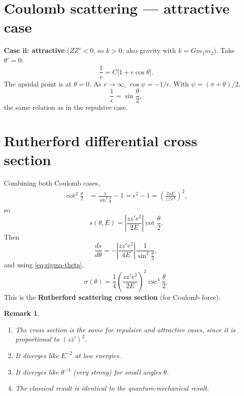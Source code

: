 \documentclass[11pt]{article}
\newtheorem{remark}{Remark}
\begin{document}
\section{Coulomb scattering --- attractive case}

\textbf{Case ii: attractive} ($ZZ' < 0$, so $k > 0$; also gravity with $k = Gm_1m_2$).
Take $\theta' = 0$:
\begin{equation}
  \frac{1}{r} = C\bigl[1 + \epsilon\cos\theta\bigr].
\end{equation}
The apsidal point is at $\theta = 0$. As $r \to \infty$, $\cos\psi = -1/\epsilon$.
With $\psi = (\pi + \theta)/2$,
\begin{equation}
  \frac{1}{\epsilon} = \sin\frac{\theta}{2},
\end{equation}
the same relation as in the repulsive case.

\section{Rutherford differential cross section}

Combining both Coulomb cases,
\begin{align}
  \cot^2\frac{\theta}{2}
  &= \frac{1}{\sin^2\frac{\theta}{2}} - 1
  = \epsilon^2 - 1
  = \left(\frac{2sE}{zz'e^2}\right)^2,
\end{align}
so
\begin{equation}
  s(\theta,E) = \left|\frac{zz'e^2}{2E}\right|\cot\frac{\theta}{2}.
\end{equation}
Then
\begin{equation}
  \frac{ds}{d\theta}
  = -\left|\frac{zz'e^2}{4E}\right|\frac{1}{\sin^2\frac{\theta}{2}},
\end{equation}
and using \eqref{eq:sigma-theta},
\begin{equation}
  \sigma(\theta) = \frac{1}{4}\left(\frac{zz'e^2}{2E}\right)^2
  \csc^4\frac{\theta}{2}.
  \label{eq:rutherford}
\end{equation}
This is the \textbf{Rutherford scattering cross section} (for Coulomb force).

\begin{remark}
\begin{enumerate}
  \item The cross section is the same for repulsive and attractive cases, since it is proportional to $(zz')^2$.
  \item It diverges like $E^{-2}$ at low energies.
  \item It diverges like $\theta^{-4}$ (very strong) for small angles $\theta$.
  \item The classical result is identical to the quantum-mechanical result.
\end{enumerate}
\end{remark}
\end{document}
